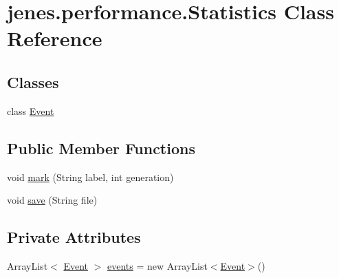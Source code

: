 \hypertarget{classjenes_1_1performance_1_1_statistics}{\section{jenes.\-performance.\-Statistics Class Reference}
\label{classjenes_1_1performance_1_1_statistics}
}
\subsection*{Classes}
\begin{DoxyCompactItemize}
\item 
class \hyperlink{classjenes_1_1performance_1_1_statistics_1_1_event}{Event}
\end{DoxyCompactItemize}
\subsection*{Public Member Functions}
\begin{DoxyCompactItemize}
\item 
void \hyperlink{classjenes_1_1performance_1_1_statistics_a99898ca71f17c19122bad26663e1fad5}{mark} (String label, int generation)
\item 
void \hyperlink{classjenes_1_1performance_1_1_statistics_a3d1d4790dfe7b6e6d59fb5d1027daec7}{save} (String file)
\end{DoxyCompactItemize}
\subsection*{Private Attributes}
\begin{DoxyCompactItemize}
\item 
Array\-List$<$ \hyperlink{classjenes_1_1performance_1_1_statistics_1_1_event}{Event} $>$ \hyperlink{classjenes_1_1performance_1_1_statistics_a5886aef68f0b7857c49c4c8732da8260}{events} = new Array\-List$<$\hyperlink{classjenes_1_1performance_1_1_statistics_1_1_event}{Event}$>$()
\end{DoxyCompactItemize}


